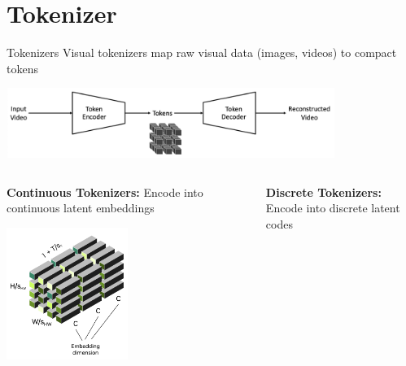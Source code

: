 \documentclass{beamer}
\begin{document}
\section{Tokenizer}
\begin{frame}[t]{Tokenizers}
    Visual tokenizers map raw visual data (images, videos) to compact tokens
        \begin{center}
            \includegraphics[width=0.8\textwidth]{./img/tokenizer_1.png}
        \end{center}
	\begin{columns}[t]
		\begin{column}{.5\textwidth}
            \textbf{Continuous Tokenizers:} Encode into continuous latent embeddings \newline
            \vspace{-1.5em}
			\begin{center}
                \includegraphics[width=0.5\textwidth]{./img/tokenizer_cont.png}
			\end{center}
		\end{column}
		\begin{column}{.5\textwidth}
            \textbf{Discrete Tokenizers:} Encode into discrete latent codes

\end{column}
\end{columns}
\end{frame}
\end{document}
